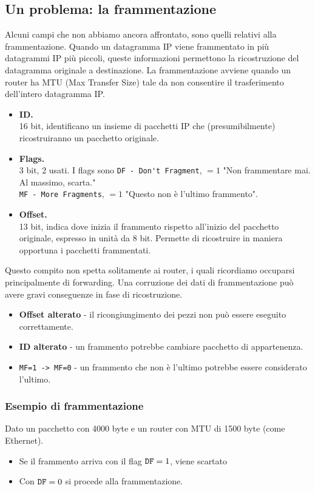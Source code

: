 \subsection{Un problema: la frammentazione}
Alcuni campi che non abbiamo ancora affrontato, sono quelli relativi alla frammentazione. Quando un datagramma IP viene frammentato in più datagrammi IP più piccoli, queste informazioni permettono la ricostruzione del datagramma originale a destinazione.
La frammentazione avviene quando un router ha MTU (Max Transfer Size) tale da non consentire il trasferimento dell'intero datagramma IP.
\begin{itemize}
	\item \textbf{ID.}\\
	16 bit, identificano un insieme di pacchetti IP che (presumibilmente) ricostruiranno un pacchetto originale.
	\item \textbf{Flags.}\\
	3 bit, 2 usati. I flags sono \verb|DF - Don't Fragment|, $=1$ "Non frammentare mai. Al massimo, scarta."\\
	\verb|MF - More Fragments|, $=1$ "Questo non è l'ultimo frammento".
	\item \textbf{Offset.}\\
	13 bit, indica dove inizia il frammento rispetto all'inizio del pacchetto originale, espresso in unità da 8 bit. Permette di ricostruire in maniera opportuna i pacchetti frammentati.
\end{itemize}

Questo compito non spetta solitamente ai router, i quali ricordiamo occuparsi principalmente di forwarding. Una corruzione dei dati di frammentazione può avere gravi conseguenze in fase di ricostruzione.

\begin{itemize}
	\item \textbf{Offset alterato} - il ricongiungimento dei pezzi non può essere eseguito correttamente.
	\item \textbf{ID alterato} - un frammento potrebbe cambiare pacchetto di appartenenza.
	\item \verb|MF=1 -> MF=0| - un frammento che non è l'ultimo potrebbe essere considerato l'ultimo.
\end{itemize}

\subsubsection{Esempio di frammentazione}
Dato un pacchetto con 4000 byte e un router con MTU di 1500 byte (come Ethernet).
\begin{itemize}
	\item Se il frammento arriva con il flag $\verb|DF|= 1$, viene scartato
	\item Con $\verb|DF|=0$ si procede alla frammentazione.
\end{itemize}

